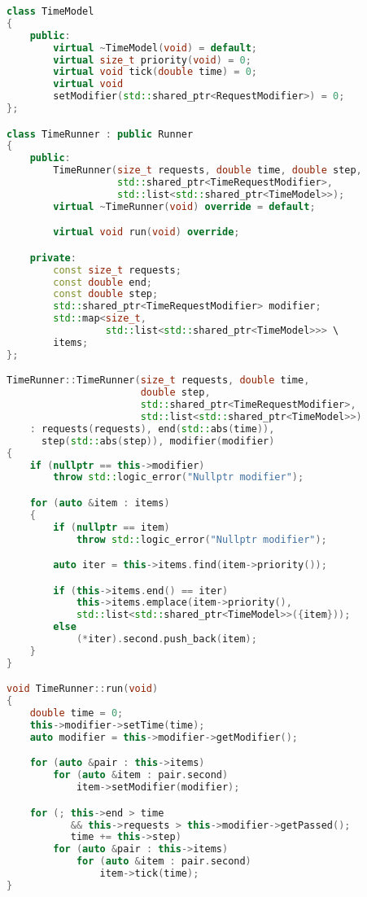 \begin{lstlisting}[caption={Реализация подхода $\Delta t$}, language=c++]
class TimeModel
{
    public:
        virtual ~TimeModel(void) = default;
        virtual size_t priority(void) = 0;
        virtual void tick(double time) = 0;
        virtual void
        setModifier(std::shared_ptr<RequestModifier>) = 0;
};

class TimeRunner : public Runner
{
    public:
        TimeRunner(size_t requests, double time, double step,
                   std::shared_ptr<TimeRequestModifier>,
                   std::list<std::shared_ptr<TimeModel>>);
        virtual ~TimeRunner(void) override = default;

        virtual void run(void) override;

    private:
        const size_t requests;
        const double end;
        const double step;
        std::shared_ptr<TimeRequestModifier> modifier;
        std::map<size_t,
                 std::list<std::shared_ptr<TimeModel>>> \
        items;
};

TimeRunner::TimeRunner(size_t requests, double time,
                       double step,
                       std::shared_ptr<TimeRequestModifier>,
                       std::list<std::shared_ptr<TimeModel>>)
    : requests(requests), end(std::abs(time)),
      step(std::abs(step)), modifier(modifier)
{
    if (nullptr == this->modifier)
        throw std::logic_error("Nullptr modifier");

    for (auto &item : items)
    {
        if (nullptr == item)
            throw std::logic_error("Nullptr modifier");

        auto iter = this->items.find(item->priority());

        if (this->items.end() == iter)
            this->items.emplace(item->priority(),
            std::list<std::shared_ptr<TimeModel>>({item}));
        else
            (*iter).second.push_back(item);
    }
}

void TimeRunner::run(void)
{
    double time = 0;
    this->modifier->setTime(time);
    auto modifier = this->modifier->getModifier();

    for (auto &pair : this->items)
        for (auto &item : pair.second)
            item->setModifier(modifier);

    for (; this->end > time
           && this->requests > this->modifier->getPassed();
           time += this->step)
        for (auto &pair : this->items)
            for (auto &item : pair.second)
                item->tick(time);
}
\end{lstlisting}

